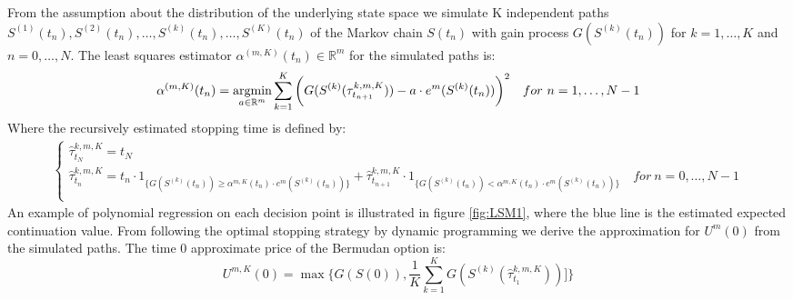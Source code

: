 From the assumption about the distribution of the underlying state space we simulate K independent paths $S^{(1)}(t_n), S^{(2)}(t_n), \ldots, S^{(k)}(t_n), \ldots, S^{(K)}(t_n)$ of the Markov chain $S(t_n)$ with gain process $G(S^{(k)}(t_n))$ for $k=1, \ldots, K$ and $n=0,\ldots,N$. The least squares estimator $\alpha^{(m,K)}(t_n)\in \mathbb{R}^m$ for the simulated paths is:
\begin{equation}\label{LSMestimator}
\alpha^{(m,K)}(t_n)= \operatorname*{argmin}_{a\in \mathbb{R}^m} \sum_{k=1}^{K} \bigg(G(S^{(k)}(\tau^{k,m,K}_{t_{n+1}}))  -a \cdot e^m(S^{(k)}(t_{n})) \bigg)^2 \quad for \ n=1, \ldots, N-1
\end{equation}
Where the recursively estimated stopping time is defined by:
\begin{equation}\label{LSMDynamic3}
\begin{split}
\begin{cases}
          \hat{\tau}_{t_N}^{k,m,K} = t_N\\
          \hat{\tau}_{t_n}^{k,m,K} = t_n \cdot 1_{\{G(S^{(k)}(t_n)) \geq \alpha^{m,K}(t_{n}) \cdot e^m(S^{(k)}(t_{n})) \}} + \hat{\tau}_{t_{n+1}}^{k,m,K} \cdot 1_{\{G(S^{(k)}(t_n)) < \alpha^{m,K}(t_{n}) \cdot e^m(S^{(k)}(t_{n})) \}} \quad for \ n={0,\ldots,N-1} \\ 
\end{cases}
\end{split}
\end{equation}
An example of polynomial regression on each decision point is illustrated in figure \ref{fig:LSM1}, where the blue line is the estimated expected continuation value. From following the optimal stopping strategy by dynamic programming we derive the approximation for $U^{m}(0)$ from the simulated paths. The time 0 approximate price of the Bermudan option is:
\begin{equation}
U^{m,K}(0) = \max \{ G(S(0)), \frac{1}{K} \sum_{k=1}^{K} G(S^{(k)}(\hat{\tau}^{k,m,K}_{t_1}))]\}
\end{equation}

